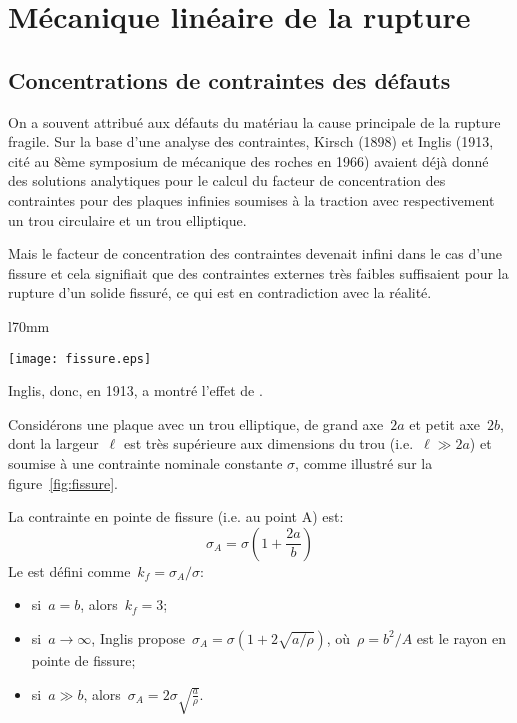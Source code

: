\newpage
\section{Mécanique linéaire de la rupture}

\medskip
\subsection{Concentrations de contraintes des défauts}

\begin{histoire}%
On a souvent attribué aux défauts du matériau la cause principale de la rupture fragile. Sur la base d'une analyse des contraintes, Kirsch (1898) et Inglis (1913, cité au 8ème symposium de mécanique des roches en 1966) avaient déjà donné des solutions analytiques pour le calcul du facteur de concentration des contraintes pour des plaques infinies soumises à la traction avec respectivement un trou circulaire et un trou elliptique.

\medskip
Mais le facteur de concentration des contraintes devenait infini dans le cas d'une fissure et cela signifiait que des contraintes externes très faibles suffisaient pour la rupture d'un solide fissuré, ce qui est en contradiction avec la réalité.
\end{histoire}

\begin{wrapfigure}{l}{70mm}
\begin{center}
\texttt{[image: fissure.eps]}\label{fig:fissure}
\end{center}
\caption{Concentration de contraintes autour d'une fissure: cas plan}\label{fig:fissure}
\end{wrapfigure}
Inglis, donc, en 1913, a montré l'effet de .

\medskip
Considérons une plaque avec un trou elliptique, de grand axe~$2a$ et petit axe~$2b$, dont la largeur~$\ell$ est très supérieure aux dimensions du trou (i.e.~$\ell\gg 2a$) et soumise à une contrainte nominale constante $\sigma$, comme illustré sur la figure~\ref{fig:fissure}. 

La contrainte en pointe de fissure (i.e. au point A) est:
\begin{equation} \sigma_A = \sigma \left( 1+\frac{2a}b\right) \end{equation}
Le  est défini comme~$k_f = \sigma_A/\sigma$:
\begin{itemize}
  \item si~$a=b$, alors~$k_f=3$;
  \item si~$a\rightarrow\infty$, Inglis propose~$\sigma_A=\sigma (1+2\sqrt{a/\rho})$,
	où~$\rho=b^2/A$ est le rayon en pointe de fissure;
  \item si~$a\gg b$, alors~$\sigma_A=2\sigma \sqrt{\frac{a}{\rho}}$.
\end{itemize}


